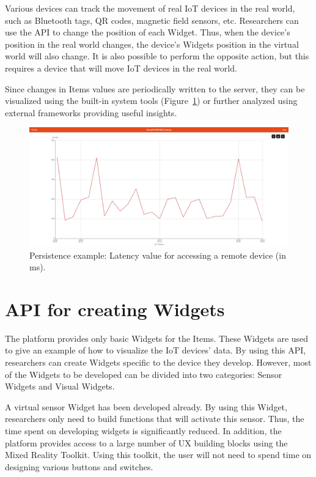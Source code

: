 Various devices can track the movement of real IoT devices in the real world, such as Bluetooth tags, QR codes, magnetic field sensors, etc. Researchers can use the API to change the position of each Widget. Thus, when the device's position in the real world changes, the device's Widgets position in the virtual world will also change. It is also possible to perform the opposite action, but this requires a device that will move IoT devices in the real world.

Since changes in Items values are periodically written to the server, they can be visualized using the built-in system tools (Figure~\ref{fig:PersistenceExample-figure}) or further analyzed using external frameworks providing useful insights.

\begin{figure}
  \centering
  \includegraphics[width=0.9\linewidth]{figures/PersistenceExample.png}
  \caption{Persistence example: Latency value for accessing a remote device (in ms). }
  \label{fig:PersistenceExample-figure}
\end{figure}

\section{API for creating Widgets}

The platform provides only basic Widgets for the Items. These Widgets are used to give an example of how to visualize the IoT devices' data. By using this API, researchers can create Widgets specific to the device they develop. However, most of the Widgets to be developed can be divided into two categories: Sensor Widgets and Visual Widgets.

A virtual sensor Widget has been developed already. By using this Widget, researchers only need to build functions that will activate this sensor. Thus, the time spent on developing widgets is significantly reduced. In addition, the platform provides access to a large number of UX building blocks using the Mixed Reality Toolkit. Using this toolkit, the user will not need to spend time on designing various buttons and switches. 


